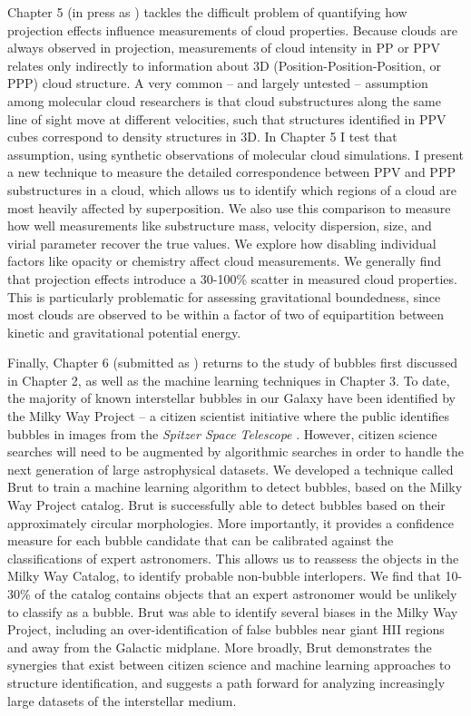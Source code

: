 Chapter 5 (in press as \citealt{Beaumont13a}) tackles the difficult problem of quantifying how projection effects influence measurements of cloud properties. Because clouds are always observed in projection, measurements of cloud intensity in PP or PPV relates only indirectly to information about 3D (Position-Position-Position, or PPP) cloud structure. A very common -- and largely untested -- assumption among molecular cloud researchers is that cloud substructures along the same line of sight move at different velocities, such that structures identified in PPV cubes correspond to density structures in 3D. In Chapter 5 I test that assumption, using synthetic observations of molecular cloud simulations. I present a new technique to measure the detailed correspondence between PPV and PPP substructures in a cloud, which allows us to identify which regions of a cloud are most heavily affected by superposition. We also use this comparison to measure how well measurements like substructure mass, velocity dispersion, size, and virial parameter recover the true values. We explore how disabling individual factors like opacity or chemistry affect cloud measurements. We generally find that projection effects introduce a 30-100\% scatter in measured cloud properties. This is particularly problematic for assessing gravitational boundedness, since most clouds are observed to be within a factor of two of equipartition between kinetic and gravitational potential energy.

Finally, Chapter 6 (submitted as \citealt{Beaumont13b}) returns to the study of bubbles first discussed in Chapter 2, as well as the machine learning techniques in Chapter 3. To date, the majority of known interstellar bubbles in our Galaxy have been identified by the Milky Way Project -- a citizen scientist initiative where the public identifies bubbles in images from the \textit{Spitzer Space Telescope} \citep{Simpson12}. However, citizen science searches will need to be augmented by algorithmic searches in order to handle the next generation of large astrophysical datasets. We developed a technique called Brut to train a machine learning algorithm to detect bubbles, based on the Milky Way Project catalog. Brut is successfully able to detect bubbles based on their approximately circular morphologies. More importantly, it provides a confidence measure for each bubble candidate that can be calibrated against the classifications of expert astronomers. This allows us to reassess the objects in the Milky Way Catalog, to identify probable non-bubble interlopers. We find that 10-30\% of the catalog contains objects that an expert astronomer would be unlikely to classify as a bubble. Brut was able to identify several biases in the Milky Way Project, including an over-identification of false bubbles near giant HII regions and away from the Galactic midplane. More broadly, Brut demonstrates the synergies that exist between citizen science and machine learning approaches to structure identification, and suggests a path forward for analyzing increasingly large datasets of the interstellar medium.




